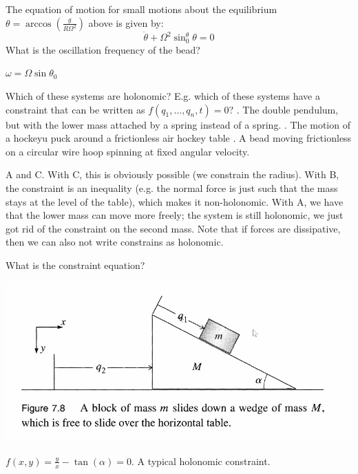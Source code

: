\documentclass[../PHYS306Notes.tex]{subfiles}
\begin{document}
\begin{p}
The equation of motion for small motions about the equilibrium $\theta = \arccos(\frac{g}{R\Omega^2})$ above is given by:
\[\ddot{\theta} +\Omega^2\sin^\theta_0\theta = 0\]
What is the oscillation frequency of the bead?
\end{p}
\begin{s}
$\omega = \Omega\sin\theta_0$
\end{s}

\begin{p}
Which of these systems are holonomic? E.g. which of these systems have a constraint that can be written as $f(q_1, \ldots, q_n, t) = 0$?
. The double pendulum, but with the lower mass attached by a spring instead of a spring.
. The motion of a hockeyu puck around a frictionless air hockey table
. A bead moving frictionless on a circular wire hoop spinning at fixed angular velocity.
\end{p}
\begin{s}
A and C. With C, this is obviously possible (we constrain the radius). With B, the constraint is an inequality (e.g. the normal force is just such that the mass stays at the level of the table), which makes it non-holonomic. With A, we have that the lower mass can move more freely; the system is still holonomic, we just got rid of the constraint on the second mass. Note that if forces are dissipative, then we can also not write constrains as holonomic.
\end{s}

\begin{p}
What is the constraint equation?
\begin{center}
    \includegraphics[scale=0.75]{Lecture-13/w13-img1.png}
\end{center}
\end{p}
\begin{s}
$f(x,y) = \frac{y}{x} - \tan(\alpha) = 0$. A typical holonomic constraint.
\end{s}
\end{document}
